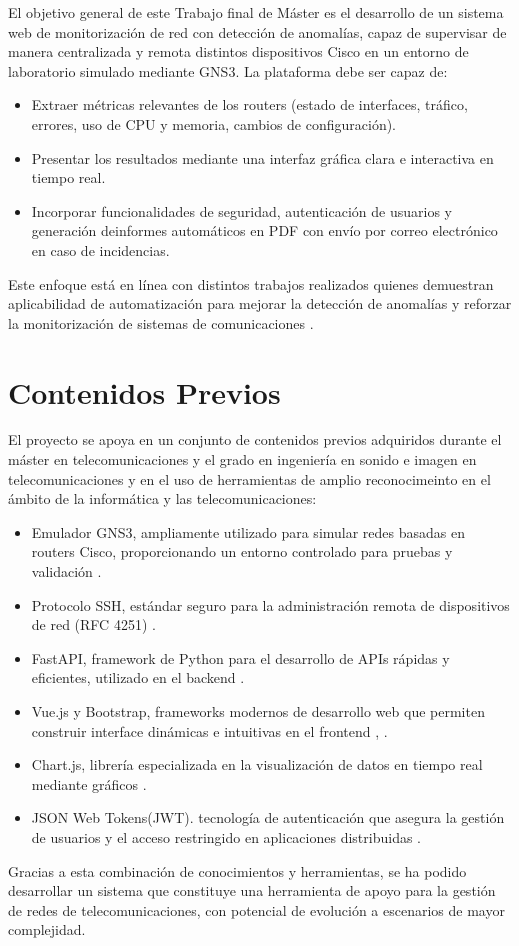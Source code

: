 El objetivo general de este Trabajo final de Máster es el desarrollo de un sistema web de monitorización de red con detección de anomalías, capaz de supervisar de manera centralizada y remota distintos dispositivos Cisco en un entorno de laboratorio simulado mediante GNS3. La plataforma debe ser capaz de:
\begin{itemize}
    \item Extraer métricas relevantes de los routers (estado de interfaces, tráfico, errores, uso de CPU y memoria, cambios de configuración).
    \item Presentar los resultados mediante una interfaz gráfica clara e interactiva en tiempo real.
    \item Incorporar funcionalidades de seguridad, autenticación de usuarios y generación deinformes automáticos en PDF con envío por correo electrónico en caso de incidencias.  
\end{itemize}
Este enfoque está en línea con distintos trabajos realizados quienes demuestran aplicabilidad de automatización para mejorar la detección de anomalías y reforzar la monitorización de sistemas de comunicaciones \citep{Schummer2024}. 

\section{Contenidos Previos}

El proyecto se apoya en un conjunto de contenidos previos adquiridos durante el máster en telecomunicaciones y el grado en ingeniería en sonido e imagen en telecomunicaciones y en el uso de herramientas de amplio reconocimeinto en el ámbito de la informática y las telecomunicaciones:
\begin{itemize}
    \item Emulador GNS3, ampliamente utilizado para simular redes basadas en routers Cisco, proporcionando un entorno controlado para pruebas y validación \citep{GNS3}.
    \item Protocolo SSH, estándar seguro para la administración remota de dispositivos de red (RFC 4251) \citep{SSH}.
    \item FastAPI, framework de Python para el desarrollo de APIs rápidas y eficientes, utilizado en el backend \citep{FastAPI}.
    \item Vue.js y Bootstrap, frameworks modernos de desarrollo web que permiten construir interface dinámicas e intuitivas en el frontend \citep{Vue}, \citep{Bootstrap}.
    \item Chart.js, librería especializada en la visualización de datos en tiempo real mediante gráficos \citep{ChartJS}.
    \item JSON Web Tokens(JWT). tecnología de autenticación que asegura la gestión de usuarios y el acceso restringido en aplicaciones distribuidas \citep{JWT}.
\end{itemize}

Gracias a esta combinación de conocimientos y herramientas, se ha podido desarrollar un sistema que constituye una herramienta de apoyo para la gestión de redes de telecomunicaciones, con potencial de evolución a escenarios de mayor complejidad.

